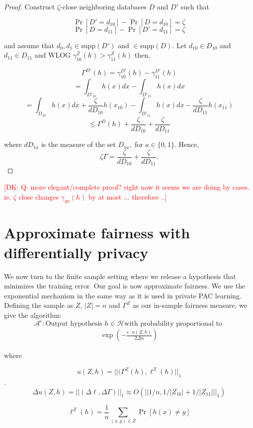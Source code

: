 \documentclass[format = sigconf]{acmart}
\newcommand{\dk}[1]{\textcolor{red}{[DK: #1]}}
\newcommand{\1}{\mathbbm{1}}
\newcommand{\eps}{\epsilon}
\newcommand{\zt}{\zeta}
\newcommand{\z}[1]{Z_{#1}}
\theoremstyle{definition}
\begin{document}
\begin{proof}
Construct $\zt$-close neighboring databases $D$ and $D'$ such that

$$\Pr[D'=d_{10}] - \Pr[D=d_{10}] = \zt$$
$$\Pr[D=d_{11}] - \Pr[D'=d_{11}] = \zt$$



and assume that $d_0, d_1 \in \text{supp}(D')$ and $\in \text{supp}(D)$. Let $d_{10} \in D_{10}$ and $d_{11} \in D_{11}$ and WLOG $\gamma_{10}^Z(h) > \gamma_{11}^Z(h)$ then,

$$\Gamma^{D'}(h) = \gamma_{10}^{D'}(h) - \gamma_{11}^{D'}(h)$$
$$= \int_{D'_{10}}h(x)dx - \int_{D'_{11}}h(x)dx$$
$$= \int_{D_{10}}h(x)dx + \frac{\zt}{dD_{10}}h(x_{10}) - \int_{D'_{11}}h(x)dx - \frac{\zt}{dD_{11}}h(x_{11})$$
$$\leq \Gamma^{D}(h) + \frac{\zt}{dD_{10}} + \frac{\zt}{dD_{11}}$$

where $dD_{1a}$ is the measure of the set $D_{1a},$ for $a \in \{0,1\}$. Hence,
$$\zt\Gamma = \frac{\zt}{dD_{10}} + \frac{\zt}{dD_{11}}.$$
\end{proof}

\dk{Q: more elegant/complete proof? right now it seems we are doing by cases. ie. $\zt$ close changes $\gamma_{ya}(h)$ by at most ... therefore ..}

\section{Approximate fairness with differentially privacy}



We now turn to the finite sample setting where we release a hypothesis
that minimizes the training error. Our goal is now approximate
fairness. We use the exponential mechanism in the same way as it is
used in private PAC learning. Defining the sample as $Z$, $|Z| = n$ and
$\Gamma^{Z}$ as our in-sample fairness measure, we give the algorithm:
$$\mathcal{A}^\eps : \text{Output hypothesis }h \in \mathcal{H} \text{
with probability proportional to }$$
\begin{align}
\exp(-\frac{\eps \cdot u(Z,h)}{2\Delta u})
\end{align}

where

$$u(Z,h) = ||(\Gamma^Z(h), \ell^Z(h)||_{1}$$.
$$\Delta u(Z,h) = ||(\Delta\ell,\Delta{\Gamma})||_1 \approx O(||1/n,1/|\z{10}|+1/|Z_{11}|||_1)$$

$$\ell^Z(h) = \frac{1}{n} \sum_{(x,y) \in Z}\Pr[h(x) \neq y]$$
\end{document}
